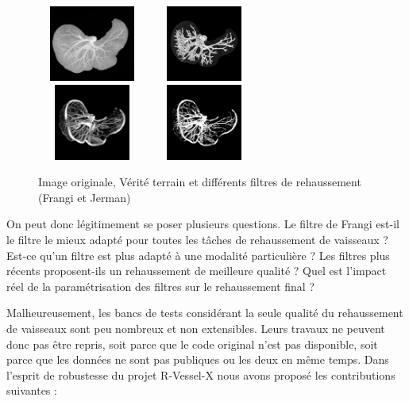 \begin{figure}
\centering
\includegraphics[clip = true, trim  =  10 60 10 60, height=25mm,width=36mm]{Images/Ircad_original_volume.png}
\includegraphics[clip = true, trim  =  10 150 10 150, height=25mm,width=36mm]{Images/Ircad_GT.png}
\\
\includegraphics[clip = true, trim  =  10 150 10 150, height=25mm,width=36mm]{Images/Ircad_Frangi.png}
\includegraphics[clip = true, trim  =  10 150 10 150, height=25mm,width=36mm]{Images/Ircad_Jerman.png}
\caption{Image originale, Vérité terrain et différents filtres de rehaussement (Frangi et Jerman)}
\label{fig:enhancement_example}
\end{figure}

On peut donc légitimement se poser plusieurs questions. Le filtre de Frangi est-il le filtre le mieux adapté pour toutes les tâches de rehaussement de vaisseaux ? Est-ce qu'un filtre est plus adapté à une modalité particulière ? Les filtres plus récents proposent-ils un rehaussement de meilleure qualité ? Quel est l'impact réel de la paramétrisation des filtres sur le rehaussement final ?

Malheureusement, les bancs de tests considérant la seule qualité du rehaussement de vaisseaux sont peu nombreux et non extensibles. Leurs travaux ne peuvent donc pas être repris, soit parce que le code original n'est pas disponible, soit parce que les données ne sont pas publiques ou les deux en même temps. Dans l'esprit de robustesse du projet R-Vessel-X nous avons proposé les contributions suivantes :

